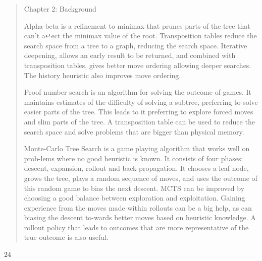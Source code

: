 \begin{quote}
Chapter 2: Background

Alpha-beta is a refinement to minimax that prunes parts of the tree that
can't a↵ect the minimax value of the root. Transposition tables reduce
the search space from a tree to a graph, reducing the search space.
Iterative deepening, allows an early result to be returned, and combined
with transposition tables, gives better move ordering allowing deeper
searches. The history heuristic also improves move ordering.

Proof number search is an algorithm for solving the outcome of games. It
maintains estimates of the difficulty of solving a subtree, preferring
to solve easier parts of the tree. This leads to it preferring to
explore forced moves and slim parts of the tree. A transposition table
can be used to reduce the search space and solve problems that are
bigger than physical memory.

Monte-Carlo Tree Search is a game playing algorithm that works well on
prob-lems where no good heuristic is known. It consists of four phases:
descent, expansion, rollout and back-propagation. It chooses a leaf
node, grows the tree, plays a random sequence of moves, and uses the
outcome of this random game to bias the next descent. MCTS can be
improved by choosing a good balance between exploration and
exploitation. Gaining experience from the moves made within rollouts can
be a big help, as can biasing the descent to-wards better moves based on
heuristic knowledge. A rollout policy that leads to outcomes that are
more representative of the true outcome is also useful.
\end{quote}

24


